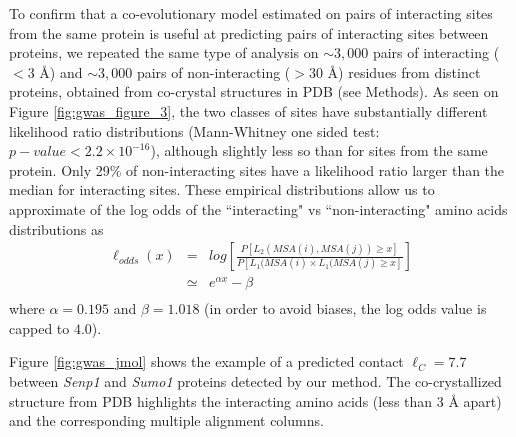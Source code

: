
To confirm that a co-evolutionary model estimated on pairs of interacting sites from the same protein is useful at predicting pairs of interacting sites between proteins, we repeated the same type of analysis on $\sim3,000$ pairs of interacting ($< 3$ \r{A}) and $\sim3,000$ pairs of non-interacting ($>30$ \r{A}) residues from distinct proteins, obtained from co-crystal structures in PDB (see Methods). 
As seen on Figure \ref{fig:gwas_figure_3}, the two classes of sites have substantially different likelihood ratio distributions (Mann-Whitney one sided test: $p-value < 2.2 \times 10^{-16}$), although slightly less so than for sites from the same protein. Only 29\% of non-interacting sites have a likelihood ratio larger than the median for interacting sites. 
These empirical distributions allow us to approximate of the log odds of the ``interacting" vs ``non-interacting" amino acids distributions as
\begin{eqnarray*}
\ell_{odds}(x) & = & log\left[ \frac{P[ L_2(MSA(i), MSA(j)) \ge x ]}{P[ L_1(MSA(i) \times L_1(MSA(j) \ge x]} \right] \\
    & \simeq &e^{\alpha x}- \beta \\
\end{eqnarray*}
\noindent where $\alpha = 0.195$ and $\beta = 1.018$ (in order to avoid biases, the log odds value is capped to $4.0$).


Figure \ref{fig:gwas_jmol} shows the example of a predicted contact $\ell_C = 7.7$ between \textit{Senp1} and \textit{Sumo1} proteins detected by our method. The co-crystallized structure from PDB highlights the interacting amino acids (less than $3$ \r{A} apart) and the corresponding multiple alignment columns.


